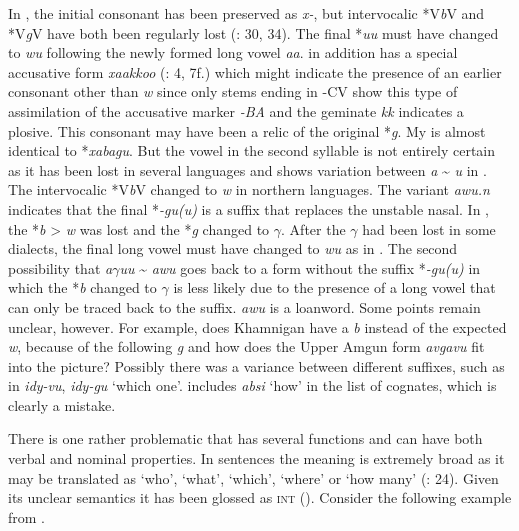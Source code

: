 \newpage 
In , the initial consonant has been preserved as \textit{x-}, but intervocalic *V\textit{b}V and *V\textit{g}V have both been regularly lost (\citealt{Benzing1956}: 30, 34). The final *\textit{uu} must have changed to \textit{wu} following the newly formed long vowel \textit{aa}.  in addition has a special accusative form \textit{xaakkoo} (\citealt{Tsumagari2009b}: 4, 7f.) which might indicate the presence of an earlier consonant other than \textit{w} since only stems ending in -CV show this type of assimilation of the accusative marker \textit{-BA} and the geminate \textit{kk} indicates a plosive. This consonant may have been a relic of the original *\textit{g}. My  is almost identical to  *\textit{xabagu}. But the vowel in the second syllable is not entirely certain as it has been lost in several languages and shows variation between \textit{a} {\textasciitilde} \textit{u} in . The intervocalic *V\textit{b}V changed to \textit{w} in northern  languages. The  variant \textit{awu.n} indicates that the final *\textit{-gu(u)} is a suffix that replaces the unstable nasal. In , the *\textit{b} > \textit{w} was lost and the *\textit{g} changed to \textit{$\gamma $}. After the \textit{$\gamma $} had been lost in some  dialects, the final long vowel must have changed to \textit{wu} as in . The second possibility that  \textit{a$\gamma $uu} {\textasciitilde} \textit{awu} goes back to a form without the suffix *\textit{-gu(u)} in which the *\textit{b} changed to \textit{$\gamma $} is less likely due to the presence of a long vowel that can only be traced back to the suffix.  \textit{awu} is a  loanword. Some points remain unclear, however. For example, does Khamnigan have a \textit{b} instead of the expected \textit{w}, because of the following \textit{g} and how does the Upper Amgun  form \textit{avgavu} fit into the picture? Possibly there was a variance between different suffixes, such as in  \textit{idy-}\textit{vu}, \textit{idy-gu} ‘which one’. \cite[4f.]{Cincius1975/77} includes  \textit{absi} ‘how’ in the list of cognates, which is clearly a mistake.

There is one rather problematic  that has several functions and can have both verbal and nominal properties. In  sentences the meaning is extremely broad as it may be translated as ‘who’, ‘what’, ‘which’, ‘where’ or ‘how many’ (\citealt{BulatovaGrenoble1999}: 24). Given its unclear semantics it has been glossed as \textsc{int} (). Consider the following example from .

